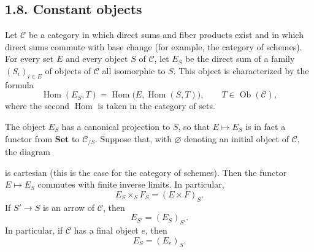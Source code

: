 
\subsection*{1.8. Constant objects}

Let \(\mathscr C\) be a category in which direct sums and fiber products
exist and in which direct sums commute with base change (for example, the
category of schemes). For every set \(E\) and every object \(S\) of
\(\mathscr C\), let \(E_S\) be the direct sum of a family
\((S_i)_{i\in E}\) of objects of \(\mathscr C\) all isomorphic to \(S\).
This object is characterized by the formula
\[
  \operatorname{Hom}(E_S,T)
  =\operatorname{Hom}\bigl(E,\operatorname{Hom}(S,T)\bigr),
  \qquad T\in\operatorname{Ob}(\mathscr C),
\]
where the second \(\operatorname{Hom}\) is taken in the category of sets.

The object \(E_S\) has a canonical projection to \(S\), so that
\(E\mapsto E_S\) is in fact a functor from \(\mathbf{Set}\) to
\(\mathscr C_{/S}\). Suppose that, with \(\varnothing\) denoting an initial
object of \(\mathscr C\), the diagram

\begin{center}
  
\end{center}
is cartesian (this is the case for the category of schemes). Then the
functor \(E\mapsto E_S\) commutes with finite inverse limits. In
particular,
\[
  E_S\mathbin{\times_S}F_S=(E\times F)_S.
\]
If \(S'\to S\) is an arrow of \(\mathscr C\), then
\[
  E_{S'}=(E_S)_{S'}.
\]
In particular, if \(\mathscr C\) has a final object \(e\), then
\[
  E_S=(E_e)_S.
\]

